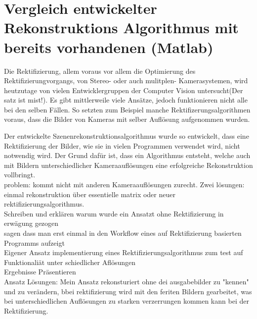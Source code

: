 \chapter{Vergleich entwickelter Rekonstruktions Algorithmus mit bereits vorhandenen (Matlab)}
\label{sec:rectification}

Die Rektifizierung, allem voraus vor allem die Optimierung des Rektifizierungvorgangs, von Stereo- oder auch mulitplen- Kamerasystemen, wird heutzutage von vielen Entwicklergruppen der Computer Vision untersucht(Der satz ist mist!). Es gibt mittlerweile viele Ansätze, jedoch funktionieren nicht alle bei den selben Fällen. So setzten zum Beispiel manche Rektifizerungsalgorithmen voraus, dass die Bilder von Kameras mit selber Auflösung aufgenommen wurden.

Der entwickelte Szenenrekonstruktionsalgorithmus wurde so entwickelt, dass eine Rektifizierung der Bilder, wie sie in vielen Programmen verwendet wird, nicht notwendig wird. Der Grund dafür ist, dass ein Algorithmus entsteht, welche auch mit Bildern unterschiedlicher Kameraauflösungen eine erfolgreiche Rekonstruktion vollbringt.\\

problem: kommt nicht mit anderen Kameraauflösungen zurecht. Zwei lösungen: einmal rekonstruktion über essentielle matrix oder neuer rektifizierungsalgorithmus.\\

Schreiben und erklären warum wurde ein Ansatzt ohne Rektifizierung in erwägung gezogen \\

sagen dass man erst einmal in den Workflow eines auf Rektifizierung basierten Programms aufzeigt\\



Eigener Ansatz implementierung eines Rektifizierungsalgorithmus zum test auf Funktionaliät unter schiedlicher Aflösungen \\

Ergebnisse Präsentieren\\

Ansatz Lösungen: Mein Ansatz rekonsturiert ohne dei ausgabebilder zu "kennen" und zu verändern, bbei rektifizierung wird mit den feriten Bildern gearbeitet, was bei unterschiedlichen Auflösungen zu starken verzerrungen kommen kann bei der Rektifizierung.

